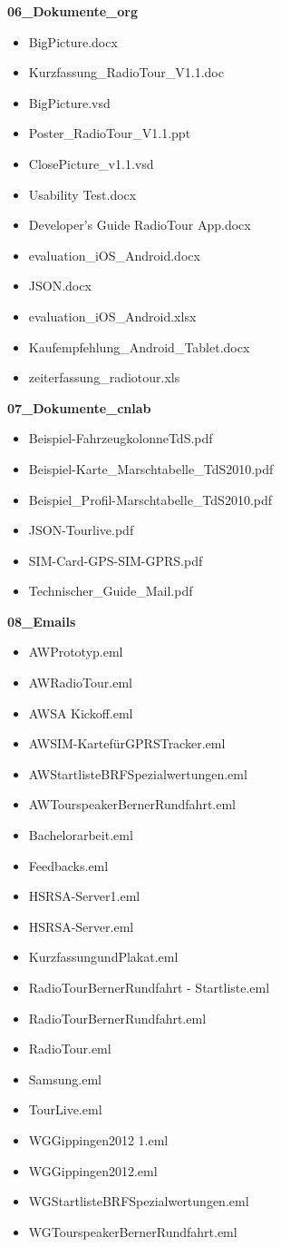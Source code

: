 \textbf{06\_Dokumente\_org}
\begin{itemize}
\item BigPicture.docx				
\item Kurzfassung\_RadioTour\_V1.1.doc
\item BigPicture.vsd				
\item Poster\_RadioTour\_V1.1.ppt
\item ClosePicture\_v1.1.vsd			
\item Usability Test.docx
\item Developer’s Guide RadioTour App.docx	
\item evaluation\_iOS\_Android.docx
\item JSON.docx				
\item evaluation\_iOS\_Android.xlsx
\item Kaufempfehlung\_Android\_Tablet.docx	
\item zeiterfassung\_radiotour.xls
\end{itemize}

\textbf{07\_Dokumente\_cnlab}
\begin{itemize}
\item Beispiel-FahrzeugkolonneTdS.pdf
\item Beispiel-Karte\_Marschtabelle\_TdS2010.pdf
\item Beispiel\_Profil-Marschtabelle\_TdS2010.pdf
\item JSON-Tourlive.pdf
\item SIM-Card-GPS-SIM-GPRS.pdf
\item Technischer\_Guide\_Mail.pdf
\end{itemize}

\textbf{08\_Emails}
\begin{itemize}
\item AWPrototyp.eml
\item AWRadioTour.eml
\item AWSA Kickoff.eml
\item AWSIM-KartefürGPRSTracker.eml
\item AWStartlisteBRFSpezialwertungen.eml
\item AWTourspeakerBernerRundfahrt.eml
\item Bachelorarbeit.eml
\item Feedbacks.eml
\item HSRSA-Server1.eml
\item HSRSA-Server.eml
\item KurzfassungundPlakat.eml
\item RadioTourBernerRundfahrt - Startliste.eml
\item RadioTourBernerRundfahrt.eml
\item RadioTour.eml
\item Samsung.eml
\item TourLive.eml
\item WGGippingen2012 1.eml
\item WGGippingen2012.eml
\item WGStartlisteBRFSpezialwertungen.eml
\item WGTourspeakerBernerRundfahrt.eml
\end{itemize}


